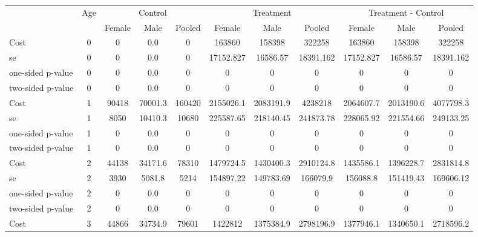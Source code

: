 \begin{tabular}{lcccccccccc} \hline \hline
 &Age & \multicolumn{3}{c}{Control} & \multicolumn{3}{c}{Treatment} & \multicolumn{3}{c}{Treatment - Control} \\ 
& & Female  & Male  & Pooled  & Female  & Male  & Pooled  & Female  & Male  & Pooled  \\  \hline  
Cost 			  &        0 &         0 &       0.0 &         0 & 163860 & 158398 & 322258 & 163860 & 158398 & 322258 \\  
se 				 &          0 &         0 &       0.0 &         0 & 17152.827 & 16586.57 & 18391.162 & 17152.827 & 16586.57 & 18391.162 \\  
one-sided p-value&          0 &         0 &       0.0 &         0 & 0 & 0 & 0 & 0 & 0 & 0 \\                                                
two-sided p-value&          0 &         0 &       0.0 &         0 & 0 & 0 & 0 & 0 & 0 & 0 \\                                                
Cost 			  &         1 &     90418 &   70001.3 &    160420 & 2155026.1 & 2083191.9 & 4238218 & 2064607.7 & 2013190.6 & 4077798.3 \\  
se 				 &          1 &      8050 &   10410.3 &     10680 & 225587.65 & 218140.45 & 241873.78 & 228065.92 & 221554.66 & 249133.25 \\
one-sided p-value&          1 &         0 &       0.0 &         0 & 0 & 0 & 0 & 0 & 0 & 0 \\                                                
two-sided p-value&          1 &         0 &       0.0 &         0 & 0 & 0 & 0 & 0 & 0 & 0 \\                                                
Cost 			  &         2 &     44138 &   34171.6 &     78310 & 1479724.5 & 1430400.3 & 2910124.8 & 1435586.1 & 1396228.7 & 2831814.8 \\
se 				 &          2 &      3930 &    5081.8 &      5214 & 154897.22 & 149783.69 & 166079.9 & 156088.8 & 151419.43 & 169606.12 \\  
one-sided p-value&          2 &         0 &       0.0 &         0 & 0 & 0 & 0 & 0 & 0 & 0 \\                                                
two-sided p-value&          2 &         0 &       0.0 &         0 & 0 & 0 & 0 & 0 & 0 & 0 \\                                                
Cost 			  &         3 &     44866 &   34734.9 &     79601 & 1422812 & 1375384.9 & 2798196.9 & 1377946.1 & 1340650.1 & 2718596.2 \\  

\end{tabular}
